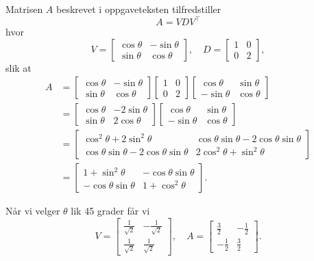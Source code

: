 \documentclass[notitlepage,a4paper,12pt,norsk]{IMFeksamen}
\newcommand{\tr}{^\top}
\newcommand{\0}{\V{0}}
\newcommand{\oppgslutt}{
\begin{center}
\pgfornament[width=6cm]{88}
\end{center}
}
\newenvironment{losning}{\begin{oppgave}}{\oppgslutt\end{oppgave}}
\begin{document}
\begin{losning}
Matrisen $A$ beskrevet i oppgaveteksten tilfredstiller \[
A=VDV\tr
\]
hvor \[
V=\begin{bmatrix}
\cos \theta  & -\sin \theta  \\  \sin \theta & \cos \theta 
\end{bmatrix}, \quad
D=
\begin{bmatrix}
1 & 0 \\
0 & 2
\end{bmatrix},
\]
slik at 
\begin{align*}
A&=
\begin{bmatrix}
\cos \theta  & -\sin \theta  \\  \sin \theta & \cos \theta 
\end{bmatrix}
\begin{bmatrix}
1 & 0 \\
0 & 2
\end{bmatrix}
\begin{bmatrix}
\cos \theta  & \sin \theta  \\  -\sin \theta & \cos \theta 
\end{bmatrix}\\
&=
\begin{bmatrix}
\cos \theta  & -2\sin \theta  \\  \sin \theta & 2\cos \theta 
\end{bmatrix}
\begin{bmatrix}
\cos \theta  & \sin \theta  \\  -\sin \theta & \cos \theta 
\end{bmatrix}\\
&=
\begin{bmatrix}
\cos^2 \theta +2\sin^2 \theta   & \cos\theta \sin \theta  -2\cos\theta \sin \theta \\  
\cos\theta \sin \theta  -2\cos\theta \sin \theta& 2\cos^2 \theta +\sin^2\theta
\end{bmatrix}\\
&=
\begin{bmatrix}
1+\sin^2 \theta   & -\cos\theta \sin \theta \\  
-\cos\theta \sin \theta& 1+\cos^2 \theta
\end{bmatrix}.
\end{align*}

Når vi velger $\theta$ lik 45 grader får vi 
\[
V=
\begin{bmatrix}
\frac{1}{\sqrt{2}}  & -\frac{1}{\sqrt{2}}  \\ \frac{1}{\sqrt{2}} & \frac{1}{\sqrt{2}}
\end{bmatrix}, \quad
A= \begin{bmatrix}
\frac{3}{2}   & -\frac{1}{2}\\  
-\frac{1}{2}& \frac{3}{2}
\end{bmatrix}.
\]



\end{losning}
\end{document}
